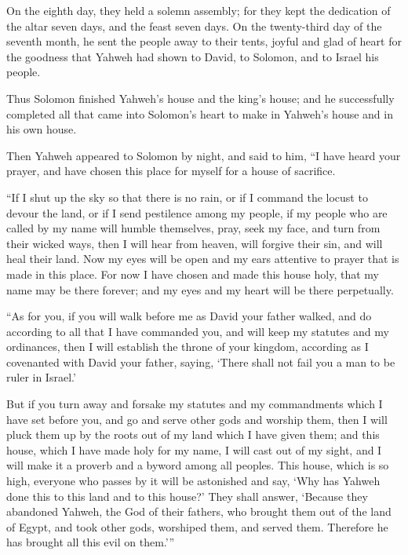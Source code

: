  On the eighth day, they held a solemn assembly; for they
kept the dedication of the altar seven days, and the feast seven days.
 On the twenty-third day of the seventh month, he sent
the people away to their tents, joyful and glad of heart for the
goodness that Yahweh had shown to David, to Solomon, and to Israel his
people.

 Thus Solomon finished Yahweh's house and the king's
house; and he successfully completed all that came into Solomon's heart
to make in Yahweh's house and in his own house.

 Then Yahweh appeared to Solomon by night, and said to
him, ``I have heard your prayer, and have chosen this place for myself
for a house of sacrifice.

 ``If I shut up the sky so that there is no rain, or if I
command the locust to devour the land, or if I send pestilence among my
people,  if my people who are called by my name will
humble themselves, pray, seek my face, and turn from their wicked ways,
then I will hear from heaven, will forgive their sin, and will heal
their land.  Now my eyes will be open and my ears
attentive to prayer that is made in this place.  For now
I have chosen and made this house holy, that my name may be there
forever; and my eyes and my heart will be there perpetually.

 ``As for you, if you will walk before me as David your
father walked, and do according to all that I have commanded you, and
will keep my statutes and my ordinances,  then I will
establish the throne of your kingdom, according as I covenanted with
David your father, saying, `There shall not fail you a man to be ruler
in Israel.'

 But if you turn away and forsake my statutes and my
commandments which I have set before you, and go and serve other gods
and worship them,  then I will pluck them up by the roots
out of my land which I have given them; and this house, which I have
made holy for my name, I will cast out of my sight, and I will make it a
proverb and a byword among all peoples.  This house,
which is so high, everyone who passes by it will be astonished and say,
`Why has Yahweh done this to this land and to this house?'
 They shall answer, `Because they abandoned Yahweh, the
God of their fathers, who brought them out of the land of Egypt, and
took other gods, worshiped them, and served them. Therefore he has
brought all this evil on them.'''

